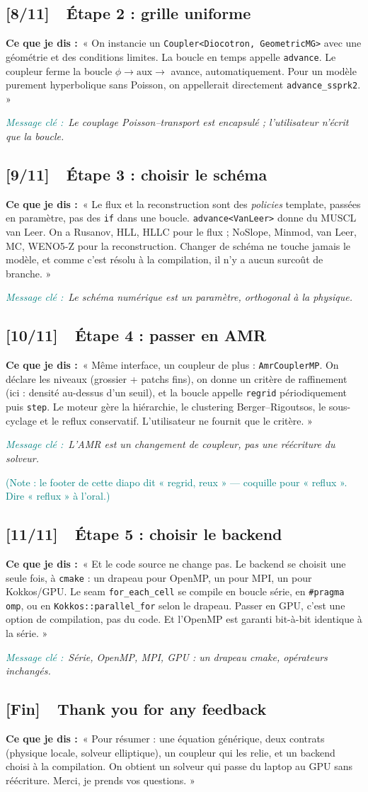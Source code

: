 \documentclass[11pt]{article}
\newcommand{\slidetag}[2]{\subsection{\textcolor{lpp}{[#1]}\ \ #2}}
\newcommand{\dit}[1]{\par\smallskip\textbf{Ce que je dis :}\ #1}
\newcommand{\msg}[1]{\par\textit{\textcolor{teal}{Message clé :}}\ \textit{#1}}
\newcommand{\code}[1]{\texttt{\small #1}}
\begin{document}
\slidetag{8/11}{Étape 2 : grille uniforme}
\dit{« On instancie un \code{Coupler<Diocotron, GeometricMG>} avec une géométrie et des
conditions limites. La boucle en temps appelle \code{advance}. Le coupleur ferme la boucle
$\phi \rightarrow \mathrm{aux} \rightarrow$ avance, automatiquement. Pour un modèle
purement hyperbolique sans Poisson, on appellerait directement \code{advance\_ssprk2}. »}
\msg{Le couplage Poisson–transport est encapsulé ; l'utilisateur n'écrit que la boucle.}

\slidetag{9/11}{Étape 3 : choisir le schéma}
\dit{« Le flux et la reconstruction sont des \emph{policies} template, passées en
paramètre, pas des \code{if} dans une boucle. \code{advance<VanLeer>} donne du MUSCL van
Leer. On a Rusanov, HLL, HLLC pour le flux ; NoSlope, Minmod, van Leer, MC, WENO5-Z pour
la reconstruction. Changer de schéma ne touche jamais le modèle, et comme c'est résolu à
la compilation, il n'y a aucun surcoût de branche. »}
\msg{Le schéma numérique est un paramètre, orthogonal à la physique.}

\slidetag{10/11}{Étape 4 : passer en AMR}
\dit{« Même interface, un coupleur de plus : \code{AmrCouplerMP}. On déclare les niveaux
(grossier + patchs fins), on donne un critère de raffinement (ici : densité au-dessus d'un
seuil), et la boucle appelle \code{regrid} périodiquement puis \code{step}. Le moteur gère
la hiérarchie, le clustering Berger–Rigoutsos, le sous-cyclage et le reflux conservatif.
L'utilisateur ne fournit que le critère. »}
\msg{L'AMR est un changement de coupleur, pas une réécriture du solveur.}
\par\smallskip\footnotesize\textcolor{teal}{(Note : le footer de cette diapo dit « regrid,
reux » — coquille pour « reflux ». Dire « reflux » à l'oral.)}\normalsize

\slidetag{11/11}{Étape 5 : choisir le backend}
\dit{« Et le code source ne change pas. Le backend se choisit une seule fois, à
\code{cmake} : un drapeau pour OpenMP, un pour MPI, un pour Kokkos/GPU. Le seam
\code{for\_each\_cell} se compile en boucle série, en \code{\#pragma omp}, ou en
\code{Kokkos::parallel\_for} selon le drapeau. Passer en GPU, c'est une option de
compilation, pas du code. Et l'OpenMP est garanti bit-à-bit identique à la série. »}
\msg{Série, OpenMP, MPI, GPU : un drapeau cmake, opérateurs inchangés.}

\slidetag{Fin}{Thank you for any feedback}
\dit{« Pour résumer : une équation générique, deux contrats (physique locale, solveur
elliptique), un coupleur qui les relie, et un backend choisi à la compilation. On obtient
un solveur qui passe du laptop au GPU sans réécriture. Merci, je prends vos questions. »}
\end{document}
